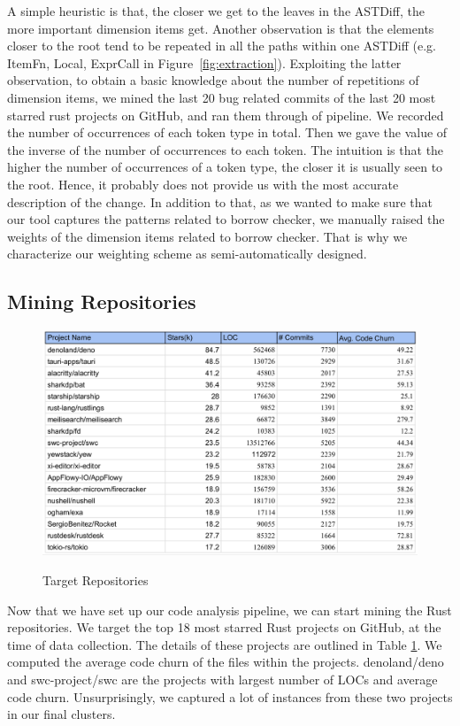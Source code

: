 A simple heuristic is that, the closer we get to the leaves in the ASTDiff, the more important dimension items get. Another observation is that the elements closer to the root tend to be repeated in all the paths within one ASTDiff (e.g. ItemFn, Local, ExprCall in Figure~\ref{fig:extraction}). Exploiting the latter observation, to obtain a basic knowledge about the number of repetitions of dimension items, we mined the last 20 bug related commits of the last 20 most starred rust projects on GitHub, and ran them through of pipeline. We recorded the number of occurrences of each token type in total. Then we gave the value of the inverse of the number of occurrences to each token. The intuition is that the higher the number of occurrences of a token type, the closer it is usually seen to the root. Hence, it probably does not provide us with the most accurate description of the change. In addition to that, as we wanted to make sure that our tool captures the patterns related to borrow checker, we manually raised the weights of the dimension items related to borrow checker. That is why we characterize our weighting scheme as semi-automatically designed. 

\subsection{Mining Repositories}

\begin{figure}[h]
\centering
\includegraphics[width=1\textwidth]{repos.png}
\label{f3}
\caption{Target Repositories}
\end{figure}

Now that we have set up our code analysis pipeline, we can start mining the Rust repositories. We target the top 18 most starred Rust projects on GitHub, at the time of data collection. The details of these projects are outlined in Table \ref{f3}. We computed the average code churn of the files within the projects. denoland/deno and swc-project/swc are the projects with largest number of LOCs and average code churn. Unsurprisingly, we captured a lot of instances from these two projects in our final clusters.

